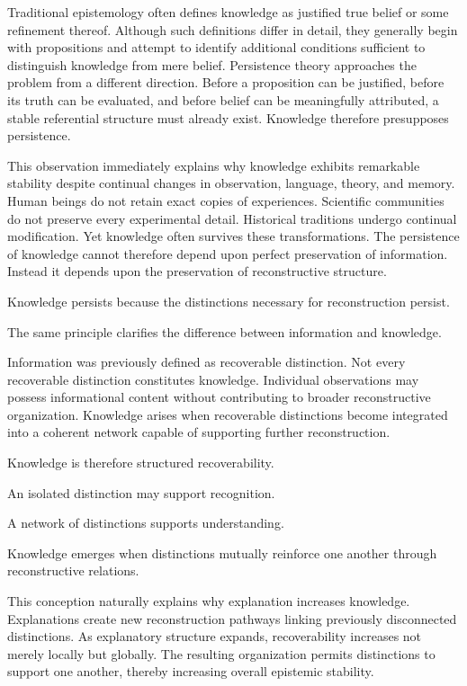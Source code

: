 \documentclass[12pt,oneside]{article}
\theoremstyle{definition}
\begin{document}
Traditional epistemology often defines knowledge as justified true belief or some refinement thereof. Although such definitions differ in detail, they generally begin with propositions and attempt to identify additional conditions sufficient to distinguish knowledge from mere belief. Persistence theory approaches the problem from a different direction. Before a proposition can be justified, before its truth can be evaluated, and before belief can be meaningfully attributed, a stable referential structure must already exist. Knowledge therefore presupposes persistence.

This observation immediately explains why knowledge exhibits remarkable stability despite continual changes in observation, language, theory, and memory. Human beings do not retain exact copies of experiences. Scientific communities do not preserve every experimental detail. Historical traditions undergo continual modification. Yet knowledge often survives these transformations. The persistence of knowledge cannot therefore depend upon perfect preservation of information. Instead it depends upon the preservation of reconstructive structure.

Knowledge persists because the distinctions necessary for reconstruction persist.

The same principle clarifies the difference between information and knowledge.

Information was previously defined as recoverable distinction. Not every recoverable distinction constitutes knowledge. Individual observations may possess informational content without contributing to broader reconstructive organization. Knowledge arises when recoverable distinctions become integrated into a coherent network capable of supporting further reconstruction.

Knowledge is therefore structured recoverability.

An isolated distinction may support recognition.

A network of distinctions supports understanding.

Knowledge emerges when distinctions mutually reinforce one another through reconstructive relations.

This conception naturally explains why explanation increases knowledge. Explanations create new reconstruction pathways linking previously disconnected distinctions. As explanatory structure expands, recoverability increases not merely locally but globally. The resulting organization permits distinctions to support one another, thereby increasing overall epistemic stability.
\end{document}
